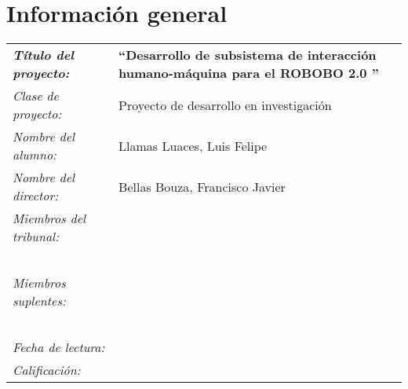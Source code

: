 \thispagestyle{empty}
\section*{Información general}
\vfill
\begin{center}
\begin{tabular}{p{4.5cm}p{9cm}}
\textbf{\emph{Título del proyecto:}} & \textbf{``Desarrollo de subsistema de interacción humano-máquina para el ROBOBO 2.0
''} \\[0.5cm]
\emph{Clase de proyecto:} & Proyecto de desarrollo en investigación \\[0.5cm]
\emph{Nombre del alumno:} & Llamas Luaces, Luis Felipe \\[0.5cm]
\emph{Nombre del director:} & Bellas Bouza, Francisco Javier \\[0.5cm]
\emph{Miembros del tribunal:} & \\[0.5cm]
& \\
& \\
& \\
& \\
& \\
\emph{Miembros suplentes:} & \\[0.5cm]
& \\
& \\
& \\
& \\
& \\
\emph{Fecha de lectura:} & \\[0.5cm]
\emph{Calificación:} & \\
\end{tabular}
\end{center}
\vfill
